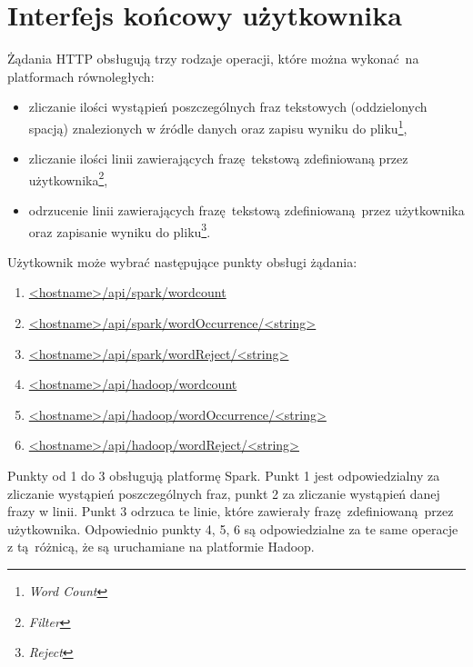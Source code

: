 \section{Interfejs końcowy użytkownika}\label{sec:user_interfaces}
Żądania HTTP obsługują trzy rodzaje operacji, które można wykonać na platformach równoległych:
\begin{itemize}\label{e2e_operations}
	\item {zliczanie ilości wystąpień poszczególnych fraz tekstowych (oddzielonych spacją) znalezionych w źródle danych oraz zapisu wyniku do pliku}\footnote{\textit{Word Count}},
	\item {zliczanie ilości linii zawierających frazę tekstową zdefiniowaną przez użytkownika}\footnote{\textit{Filter}},
	\item {odrzucenie linii zawierających frazę tekstową zdefiniowaną przez użytkownika oraz zapisanie wyniku do pliku}\footnote{\textit{Reject}}.
\end{itemize}
Użytkownik może wybrać następujące punkty obsługi żądania:
\begin{enumerate}
	\item{\url{<hostname>/api/spark/wordcount}}
	\item{\url{<hostname>/api/spark/wordOccurrence/<string> }}
	\item{\url{<hostname>/api/spark/wordReject/<string> }}
	\item{\url{<hostname>/api/hadoop/wordcount}}
	\item{\url{<hostname>/api/hadoop/wordOccurrence/<string>}}
	\item{\url{<hostname>/api/hadoop/wordReject/<string> }}
\end{enumerate}
Punkty od 1 do 3 obsługują platformę Spark. Punkt 1 jest odpowiedzialny za zliczanie wystąpień poszczególnych fraz, punkt 2 za zliczanie wystąpień danej frazy w linii. Punkt 3 odrzuca te linie, które zawierały frazę zdefiniowaną przez użytkownika. Odpowiednio punkty 4, 5, 6 są odpowiedzialne za te same operacje z tą różnicą, że są uruchamiane na platformie Hadoop.  

